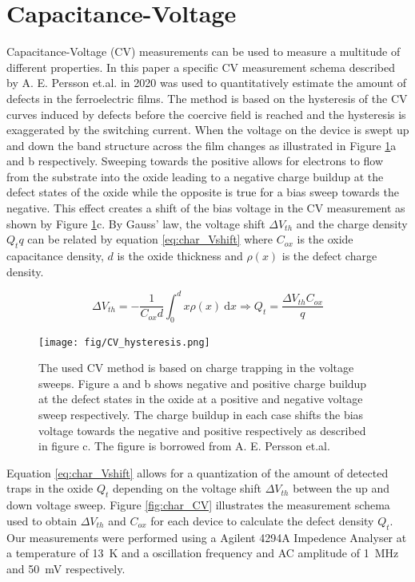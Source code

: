 \documentclass[11pt,twoside]{eitExjobb}
\begin{document}
\section{Capacitance-Voltage}\label{sec:CV}
Capacitance-Voltage (CV) measurements can be used to measure a multitude of
different properties. In this paper a specific CV measurement schema described
by A. E. Persson et.al. in 2020 was used to quantitatively estimate the amount
of defects in the ferroelectric films. \cite{persson2020method} The method is
based on the hysteresis of the CV curves induced by defects before the coercive
field is reached and the hysteresis is exaggerated by the switching current.
When the voltage on the device is swept up and down the band structure across
the film changes as illustrated in Figure \ref{fig:char_hysteresis}a and b
respectively. Sweeping towards the positive allows for electrons to flow from
the  substrate into the oxide leading to a negative charge buildup at
the defect states of the oxide while the opposite is true for a bias sweep
towards the negative. This effect creates a shift of the bias voltage in the CV
measurement as shown by Figure \ref{fig:char_hysteresis}c. By Gauss' law, the
voltage shift $\Delta V_{th}$ and the charge density $Q_t q$ can be related by
equation \ref{eq:char_Vshift} where $C_{ox}$ is the oxide capacitance density,
$d$ is the oxide thickness and $\rho(x)$ is the defect charge density.

\begin{equation}\label{eq:char_Vshift}
    \Delta V_{th} = - \frac{1}{C_{ox}d} \int_0^d x\rho(x)\ \mathrm{d}x
    \Longrightarrow Q_t = \frac{\Delta V_{th}C_{ox}}{q}
\end{equation}

\begin{figure}[htbp]
    \centering
    \texttt{[image: fig/CV\_hysteresis.png]}
    \caption{The used CV method is based on charge trapping in the voltage
        sweeps. Figure a and b shows negative and positive charge buildup at
        the defect states in the oxide at a positive and negative voltage sweep
        respectively. The charge buildup in each case shifts the bias voltage
        towards the negative and positive respectively as described in figure
        c. The figure is borrowed from A. E. Persson et.al. \cite{persson2020method}}
    \label{fig:char_hysteresis}
\end{figure}

Equation \ref{eq:char_Vshift} allows for a quantization of the amount of
detected traps in the oxide $Q_t$ depending on the voltage shift $\Delta
V_{th}$ between the up and down voltage sweep. Figure \ref{fig:char_CV}
illustrates the measurement schema used to obtain $\Delta V_{th}$ and $C_{ox}$
for each device to calculate the defect density $Q_t$. Our measurements were
performed using a Agilent 4294A Impedence Analyser at a temperature of
\SI{13}{\kelvin} and a oscillation frequency and AC amplitude of
\SI{1}{\mega\hertz} and \SI{50}{\milli\volt} respectively.
\end{document}
